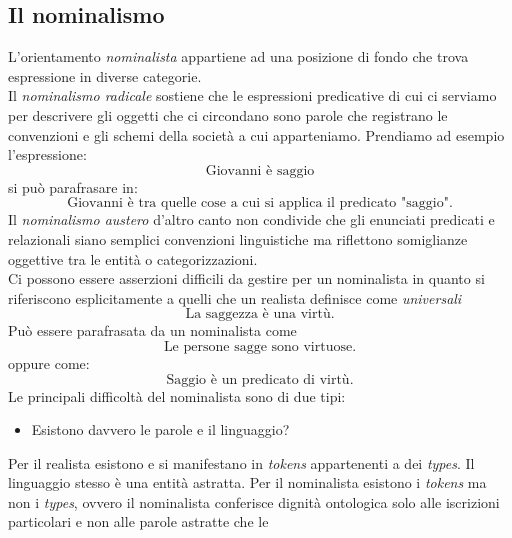 \documentclass[a4paper,12pt]{article}
\begin{document}
\subsection{Il nominalismo} %
L'orientamento \textit{nominalista} appartiene ad una posizione di fondo che trova espressione in diverse categorie.
\\ Il \textit{nominalismo radicale} sostiene che le espressioni predicative di cui ci serviamo per descrivere gli oggetti 
che ci circondano sono parole che registrano le convenzioni e gli schemi della società a cui apparteniamo. Prendiamo ad 
esempio l'espressione:
\begin{equation}
    \mbox{Giovanni è saggio}
    \label{eq:nominalismo_radicale1}
\end{equation}
si può parafrasare in:
\begin{equation}
    \mbox{Giovanni è tra quelle cose a cui si applica il predicato "saggio"}.
    \label{eq:nominalismo_radicale2}
\end{equation}
Il \textit{nominalismo austero} d'altro canto non condivide che gli enunciati predicati e relazionali siano semplici
convenzioni linguistiche ma riflettono somiglianze oggettive tra le entità o categorizzazioni.
\\ Ci possono essere asserzioni difficili da gestire per un nominalista in quanto si riferiscono esplicitamente a quelli
che un realista definisce come \textit{universali}
\begin{equation}
    \mbox{La saggezza è una virtù}.
    \label{eq:nominalismo_austero1}
\end{equation}
Può essere parafrasata da un nominalista come 
\begin{equation}
    \mbox{Le persone sagge sono virtuose}.
    \label{eq:nominalismo_austero2}
\end{equation}
oppure come:
\begin{equation}
    \mbox{Saggio è un predicato di virtù}.
    \label{eq:nominalismo_austero3}
\end{equation}
Le principali difficoltà del nominalista sono di due tipi:
\begin{itemize}
    \item Esistono davvero le parole e il linguaggio?
\end{itemize}
Per il realista esistono e si manifestano in \textit{tokens} appartenenti a dei \textit{types}. Il linguaggio 
stesso è una entità astratta. Per il nominalista esistono i \textit{tokens} ma non i \textit{types}, ovvero 
il nominalista conferisce dignità ontologica solo alle iscrizioni particolari e non alle parole astratte che le 
\end{document}

